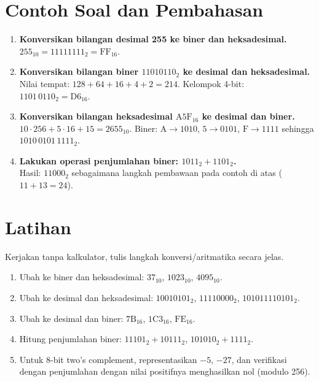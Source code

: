 \section{Contoh Soal dan Pembahasan}\label{sec:pengenalan-contoh}
\begin{enumerate}
    \item \textbf{Konversikan bilangan desimal 255 ke biner dan heksadesimal.}\\
    \(255_{10} = 11111111_2 = \mathrm{FF}_{16}\).

    \item \textbf{Konversikan bilangan biner \(11010110_2\) ke desimal dan heksadesimal.}\\
    Nilai tempat: \(128+64+16+4+2 = 214\). Kelompok 4-bit: \(1101\,0110_2 = \mathrm{D6}_{16}\).

    \item \textbf{Konversikan bilangan heksadesimal \(\mathrm{A5F}_{16}\) ke desimal dan biner.}\\
    \(10\cdot 256 + 5\cdot 16 + 15 = 2655_{10}\). Biner: \(\mathrm{A}\to 1010\), \(\mathrm{5}\to 0101\), \(\mathrm{F}\to 1111\) sehingga \(1010\,0101\,1111_2\).

    \item \textbf{Lakukan operasi penjumlahan biner: \(1011_2 + 1101_2\).}\\
    Hasil: \(11000_2\) sebagaimana langkah pembawaan pada contoh di atas (\(11+13=24\)).
\end{enumerate}

\section{Latihan}
Kerjakan tanpa kalkulator, tulis langkah konversi/aritmatika secara jelas.
\begin{enumerate}
    \item Ubah ke biner dan heksadesimal: \(37_{10}\), \(1023_{10}\), \(4095_{10}\).
    \item Ubah ke desimal dan heksadesimal: \(10010101_2\), \(11110000_2\), \(101011110101_2\).
    \item Ubah ke desimal dan biner: \(\mathrm{7B}_{16}\), \(\mathrm{1C3}_{16}\), \(\mathrm{FE}_{16}\).
    \item Hitung penjumlahan biner: \(11101_2 + 10111_2\), \(101010_2 + 1111_2\).
    \item Untuk 8-bit two's complement, representasikan \(-5\), \(-27\), dan verifikasi dengan penjumlahan dengan nilai positifnya menghasilkan nol (modulo 256).
\end{enumerate}


